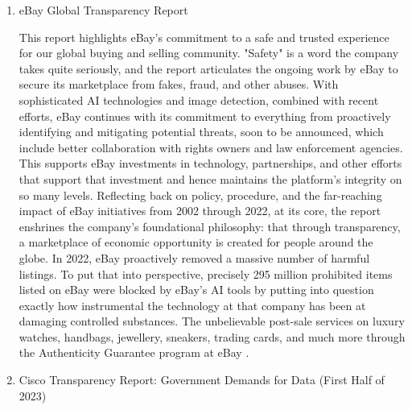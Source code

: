\begin{enumerate}
\item eBay Global Transparency Report 

 This report highlights eBay's commitment to a safe and trusted experience for our global buying and selling community. "Safety" is a word the company takes quite seriously, and the report articulates the ongoing work by eBay to secure its marketplace from fakes, fraud, and other abuses. With sophisticated AI technologies and image detection, combined with recent efforts, eBay continues with its commitment to everything from proactively identifying and mitigating potential threats, soon to be announced, which include better collaboration with rights owners and law enforcement agencies. This supports eBay investments in technology, partnerships, and other efforts that support that investment and hence maintains the platform's integrity on so many levels. Reflecting back on policy, procedure, and the far-reaching impact of eBay initiatives from 2002 through 2022, at its core, the report enshrines the company's foundational philosophy: that through transparency, a marketplace of economic opportunity is created for people around the globe. In 2022, eBay proactively removed a massive number of harmful listings. To put that into perspective, precisely 295 million prohibited items listed on eBay were blocked by eBay's AI tools by putting into question exactly how instrumental the technology at that company has been at damaging controlled substances. The unbelievable post-sale services on luxury watches, handbags, jewellery, sneakers, trading cards, and much more through the Authenticity Guarantee program at eBay \cite{eBayGlobalTransparencyReport2022}.

 \item Cisco Transparency Report: Government Demands for Data (First Half of 2023)


\end{enumerate}

